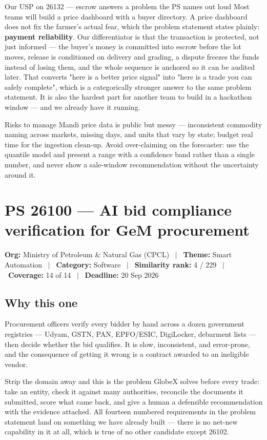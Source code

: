 \documentclass[11pt]{article}
\newcommand{\psbanner}[6]{%
  \vspace{0.2em}
  {\footnotesize\color{gxslate}\textbf{Org:} #1 \ $\vert$ \ \textbf{Theme:} #2 \ $\vert$ \ \textbf{Category:} #3 \ $\vert$ \ \textbf{Similarity rank:} #4 \ $\vert$ \ \textbf{Coverage:} #5 \ $\vert$ \ \textbf{Deadline:} #6}
  \par\vspace{0.6em}
}
\begin{document}
\begin{uspbox}{Our USP on 26132 --- escrow answers a problem the PS names out loud}
Most teams will build a price dashboard with a buyer directory. A price dashboard does not fix the
farmer's actual fear, which the problem statement states plainly: \textbf{payment reliability}. Our
differentiator is that the transaction is protected, not just informed --- the buyer's money is committed
into escrow before the lot moves, release is conditioned on delivery and grading, a dispute freezes the
funds instead of losing them, and the whole sequence is anchored so it can be audited later. That
converts "here is a better price signal" into "here is a trade you can safely complete", which is a
categorically stronger answer to the same problem statement. It is also the hardest part for another team
to build in a hackathon window --- and we already have it running.
\end{uspbox}

\begin{warnbox}{Risks to manage}
Mandi price data is public but messy --- inconsistent commodity naming across markets, missing days,
and units that vary by state; budget real time for the ingestion clean-up. Avoid over-claiming on the
forecaster: use the quantile model and present a range with a confidence band rather than a single
number, and never show a sale-window recommendation without the uncertainty around it.
\end{warnbox}

\clearpage
\section{PS 26100 --- AI bid compliance verification for GeM procurement}
\psbanner{Ministry of Petroleum \& Natural Gas (CPCL)}{Smart Automation}{Software}{4 / 229}{14 of 14}{20 Sep 2026}

\subsection*{Why this one}
Procurement officers verify every bidder by hand across a dozen government registries --- Udyam, GSTN,
PAN, EPFO/ESIC, DigiLocker, debarment lists --- then decide whether the bid qualifies. It is slow,
inconsistent, and error-prone, and the consequence of getting it wrong is a contract awarded to an
ineligible vendor.

Strip the domain away and this is the problem GlobeX solves before every trade: take an entity, check it
against many authorities, reconcile the documents it submitted, score what came back, and give a human a
defensible recommendation with the evidence attached. All fourteen numbered requirements in the problem
statement land on something we have already built --- there is no net-new capability in it at all, which
is true of no other candidate except 26102.
\end{document}
